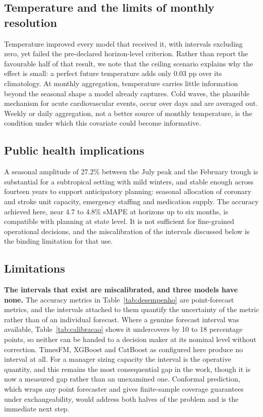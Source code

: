 \subsection{Temperature and the limits of monthly resolution}

Temperature improved every model that received it, with intervals excluding zero, yet failed
the pre-declared horizon-level criterion. Rather than report the favourable half of that
result, we note that the ceiling scenario explains why the effect is small: a perfect future
temperature adds only 0.03 pp over its climatology. At monthly aggregation, temperature
carries little information beyond the seasonal shape a model already captures. Cold waves,
the plausible mechanism for acute cardiovascular events, occur over days and are averaged
out. Weekly or daily aggregation, not a better source of monthly temperature, is the
condition under which this covariate could become informative.

\subsection{Public health implications}

A seasonal amplitude of 27.2\% between the July peak and the February trough is substantial
for a subtropical setting with mild winters, and stable enough across fourteen years to
support anticipatory planning: seasonal allocation of coronary and stroke unit capacity,
emergency staffing and medication supply. The accuracy achieved here, near 4.7 to 4.8\%
sMAPE at horizons up to six months, is compatible with planning at state level. It is not
sufficient for fine-grained operational decisions, and the miscalibration of the intervals
discussed below is the binding limitation for that use.

\subsection{Limitations}

\textbf{The intervals that exist are miscalibrated, and three models have none.} The
accuracy metrics in Table~\ref{tab:desempenho} are point-forecast metrics, and the intervals
attached to them quantify the uncertainty of the metric rather than of an individual
forecast. Where a genuine forecast interval was available, Table~\ref{tab:calibracao} shows
it undercovers by 10 to 18 percentage points, so neither can be handed to a decision maker
at its nominal level without correction. TimesFM, XGBoost and CatBoost as configured here
produce no interval at all. For a manager sizing capacity the interval is the operative
quantity, and this remains the most consequential gap in the work, though it is now a
measured gap rather than an unexamined one. Conformal prediction, which wraps any point
forecaster and gives finite-sample coverage guarantees under exchangeability, would address
both halves of the problem and is the immediate next step.

